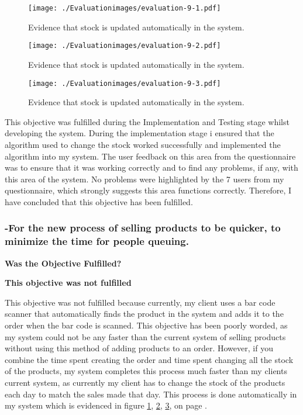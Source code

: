 \begin{figure}[H]
\caption{Evidence that stock is updated automatically in the system.} \label{fig:evaluation-9-1}
\hfill\texttt{[image: ./Evaluationimages/evaluation-9-1.pdf]}
\end{figure}

\begin{figure}[H]
\caption{Evidence that stock is updated automatically in the system.} \label{fig:evaluation-9-2}
\hfill\texttt{[image: ./Evaluationimages/evaluation-9-2.pdf]}
\end{figure}

\begin{figure}[H]
\caption{Evidence that stock is updated automatically in the system.} \label{fig:evaluation-9-3}
\hfill\texttt{[image: ./Evaluationimages/evaluation-9-3.pdf]}
\end{figure}

This objective was fulfilled during the Implementation and Testing stage whilst developing the system. During the implementation stage i ensured that the algorithm used to change the stock worked successfully and implemented the algorithm into my system. The user feedback on this area from the questionnaire was to ensure that it was working correctly and to find any problems, if any, with this area of the system. No problems were highlighted by the 7 users from my questionnaire, which strongly suggests this area functions correctly. Therefore, I have concluded that this objective has been fulfilled.



\pagebreak
\subsubsection{-For the new process of selling products to be quicker, to minimize the time for people queuing.}
\textbf{Was the Objective Fulfilled?} \newline

\textbf{\large{This objective was not fulfilled}}

This objective was not fulfilled because currently, my client uses a bar code scanner that automatically finds the product in the system and adds it to the order when the bar code is scanned. This objective has been poorly worded, as my system could not be any faster than the current system of selling products without using this method of adding products to an order. However, if you combine the time spent creating the order and time spent changing all the stock of the products, my system completes this process much faster than my clients current system, as currently my client has to change the stock of the products each day to match the sales made that day. This process is done automatically in my system which is evidenced in figure \ref{fig:evaluation-9-1}, \ref{fig:evaluation-9-2}, \ref{fig:evaluation-9-3}, on  page \pageref{automatic-stock-evidence}. \newline

